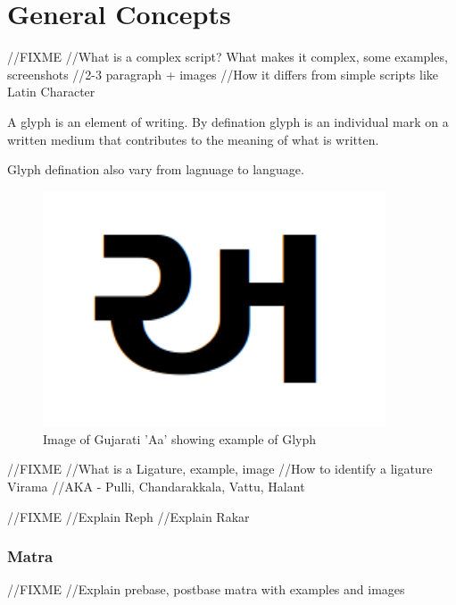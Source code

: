 \chapter{General Concepts}


//FIXME
//What is a complex script? What makes it complex, some examples, screenshots
//2-3 paragraph + images
//How it differs from simple scripts like Latin Character

A glyph is an element of writing. By defination glyph is an individual mark on
a written medium that contributes to the meaning of what is written.

Glyph defination also vary from lagnuage to language.

\begin{figure}[hb]
\centering
\includegraphics[width=4in]{Images/glyph.png}
\caption[Glyph example]
{Image of Gujarati 'Aa' showing example of Glyph}
 \end{figure}


//FIXME
//What is a Ligature, example, image
//How to identify a ligature Virama
//AKA - Pulli, Chandarakkala, Vattu, Halant



//FIXME
//Explain Reph
//Explain Rakar

\subsection*{Matra}
//FIXME
//Explain prebase, postbase matra with examples and images






